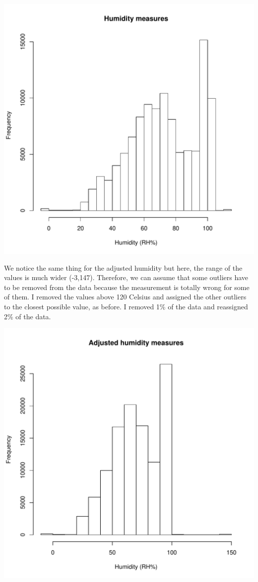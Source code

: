 \documentclass[11pt]{article}\usepackage[]{graphicx}\usepackage[]{color}
\newenvironment{knitrout}{}{} %
\begin{document}
\begin{knitrout}
\color{fgcolor}

{\centering \includegraphics[width=0.6\linewidth]{figure/unnamed-chunk-4-1} 

}



\end{knitrout}

We notice the same thing for the adjusted humidity but here, the range of the values is much wider (-3,147). Therefore, we can assume that some outliers have to be removed from the data because the measurement is totally wrong for some of them. I removed the values above 120 Celsius and assigned the other outliers to the closest possible value, as before. I removed 1\% of the data and reassigned 2\% of the data.

\begin{knitrout}
\color{fgcolor}

{\centering \includegraphics[width=0.6\linewidth]{figure/unnamed-chunk-5-1} 

}



\end{knitrout}
\end{document}
